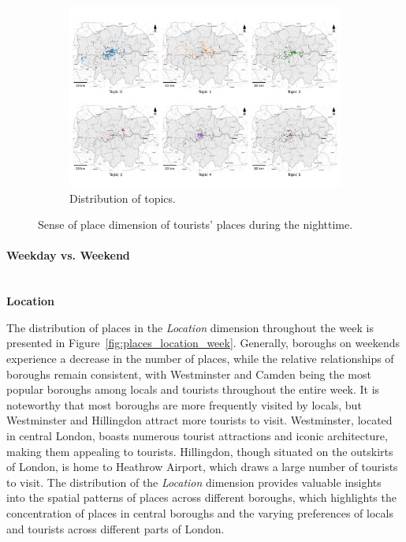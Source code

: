 \documentclass{article}
\newcommand{\subsubsubsection}[1]{\paragraph{#1}\mbox{}\\}
\theoremstyle{remark}
\begin{document}
\begin{figure}[!h]
    \begin{subfigure}{0.9\textwidth}
        \centering
        \includegraphics[width=\linewidth]{figures/topics_distribution_nighttime_tourists.png} 
        \caption{Distribution of topics.}
        \label{fig:topics_distribution_nighttime_tourists}
    \end{subfigure}

    \caption{Sense of place dimension of tourists' places during the nighttime.}
    \label{fig:places_topics_sense_tourists_nighttime}
\end{figure}

\clearpage

\subsubsubsection{Weekday vs. Weekend}

\textbf{Location}

The distribution of places in the \textit{Location} dimension throughout the week is presented in Figure~\ref{fig:places_location_week}. Generally, boroughs on weekends experience a decrease in the number of places, while the relative relationships of boroughs remain consistent, with Westminster and Camden being the most popular boroughs among locals and tourists throughout the entire week. It is noteworthy that most boroughs are more frequently visited by locals, but Westminster and Hillingdon attract more tourists to visit. Westminster, located in central London, boasts numerous tourist attractions and iconic architecture, making them appealing to tourists. Hillingdon, though situated on the outskirts of London, is home to Heathrow Airport, which draws a large number of tourists to visit. The distribution of the \textit{Location} dimension provides valuable insights into the spatial patterns of places across different boroughs, which highlights the concentration of places in central boroughs and the varying preferences of locals and tourists across different parts of London.
\end{document}
